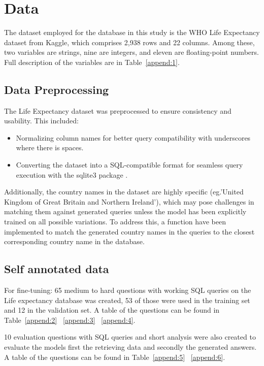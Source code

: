 \documentclass[11pt]{article}
\begin{document}
\section{Data}

The dataset employed for the database in this study is the WHO Life Expectancy dataset \cite{WHOdata} from Kaggle, which comprises 2,938 rows and 22 columns. Among these, two variables are strings, nine are integers, and eleven are floating-point numbers. Full description of the variables are in Table~\ref{append:1}.

\subsection{Data Preprocessing}
The Life Expectancy dataset was preprocessed to ensure consistency and usability. This included:
\begin{itemize}
    \item Normalizing column names for better query compatibility with underscores where there is spaces.
    \item Converting the dataset into a SQL-compatible format for seamless query execution with the sqlite3 package \cite{sqlite}.
\end{itemize}

Additionally, the country names in the dataset are highly specific (eg.'United Kingdom of Great Britain and Northern Ireland'), which may pose challenges in matching them against generated queries unless the model has been explicitly trained on all possible variations. To address this, a function have been implemented to match the generated country names in the queries to the closest corresponding country name in the database.

\subsection{Self annotated data}

For fine-tuning:
65 medium to hard questions with working SQL queries on the Life expectancy database was created, 53 of those were used in the training set and 12 in the validation set. A table of the questions can be found in Table~\ref{append:2} ~\ref{append:3} ~\ref{append:4}.

10 evaluation questions with SQL queries and short analysis were also created to evaluate the models first the retrieving data and secondly the generated answers.  A table of the questions can be found in Table~\ref{append:5} ~\ref{append:6}.
\end{document}
